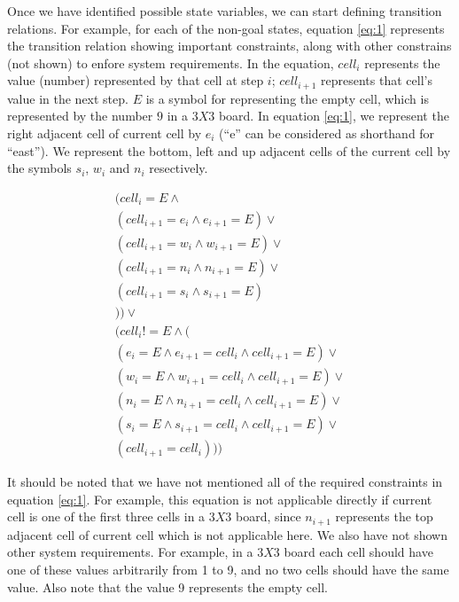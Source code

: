 \documentclass{sig-alternate-05-2015}
\begin{document}
Once we have identified possible state variables, we can start defining transition relations. 
For example, for each of the non-goal states, equation \ref{eq:1} represents the transition 
relation showing important constraints, along with other constrains (not shown) to enfore 
system requirements. In the equation, $ cell_i $ represents the value (number) represented by
that cell at step $ i $; $ cell_{i+1} $ represents that cell's value in the next step. $ E $ 
is a symbol for representing the empty cell, which is represented by the number $ 9 $ in a 
$ 3 X 3 $ board. In equation \ref{eq:1}, we represent the right adjacent cell of current cell 
by $ e_{i} $ (``e'' can be considered as shorthand for ``east''). We represent the bottom, left and up 
adjacent cells of the current cell by the symbols $ s_i $, $ w_i $ and $ n_i $ resectively. 
 
\begin{multline} \label{eq:1}
(cell_i = E \wedge \\
  (cell_{i+1} = e_{i} \wedge e_{i+1} = E) \vee \\
  (cell_{i+1} = w_{i} \wedge w_{i+1} = E) \vee \\
  (cell_{i+1} = n_{i} \wedge n_{i+1} = E) \vee \\
  (cell_{i+1} = s_{i} \wedge s_{i+1} = E) \\
))  \vee \\
(
  cell_i != E \wedge ( \\
    (e_{i} = E \wedge e_{i+1} = cell_{i} \wedge cell_{i+1} = E) \vee \\
    (w_{i} = E \wedge w_{i+1} = cell_{i} \wedge cell_{i+1} = E) \vee \\
    (n_{i} = E \wedge n_{i+1} = cell_{i} \wedge cell_{i+1} = E) \vee \\
    (s_{i} = E \wedge s_{i+1} = cell_{i} \wedge cell_{i+1} = E) \vee \\
    (cell_{i+1} = cell_{i})
  )
)
\end{multline}

It should be noted that we have not mentioned all of the required constraints in equation \ref{eq:1}. 
For example, this equation is not applicable directly if current cell is one of the first three cells 
in a $3 X 3$ board, since $n_{i+1}$ represents the top adjacent cell of current cell which is not 
applicable here. We also have not shown other system requirements. For example, in a $3 X 3$ board each 
cell should have one of these values arbitrarily from 1 to 9, and no two cells should have the same 
value. Also note that the value 9 represents the empty cell. 
\end{document}
